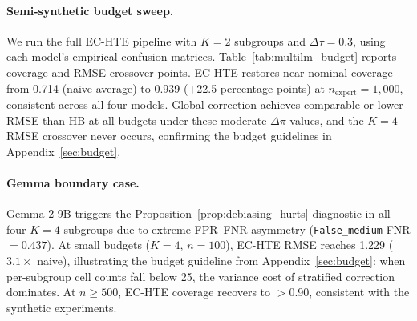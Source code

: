 \paragraph{Semi-synthetic budget sweep.}
We run the full EC-HTE pipeline with $K{=}2$ subgroups and $\Delta\tau{=}0.3$, using each model's empirical confusion matrices.
Table~\ref{tab:multilm_budget} reports coverage and RMSE crossover points.
EC-HTE restores near-nominal coverage from 0.714 (naive average) to 0.939 ($+$22.5 percentage points) at $n_{\text{expert}}{=}1{,}000$, consistent across all four models.
Global correction achieves comparable or lower RMSE than HB at all budgets under these moderate $\Delta\pi$ values, and the $K{=}4$ RMSE crossover never occurs, confirming the budget guidelines in Appendix~\ref{sec:budget}.

\begin{table}[t]
\centering
\caption{Semi-synthetic budget sweep ($K{=}2$, $\Delta\tau{=}0.3$, 50 MC runs; see Appendix~\ref{app:mcse} for MC tier justification). Coverage at selected expert budgets; RMSE crossover denotes the minimum expert budget at which HB EC-HTE achieves lower RMSE than the naive (uncorrected) estimator.}
\label{tab:multilm_budget}
\small
{}
\end{table}

\paragraph{Gemma boundary case.}
Gemma-2-9B triggers the Proposition~\ref{prop:debiasing_hurts} diagnostic in all four $K{=}4$ subgroups due to extreme FPR--FNR asymmetry (\texttt{False\_medium} FNR $= 0.437$).
At small budgets ($K{=}4$, $n{=}100$), EC-HTE RMSE reaches 1.229 ($3.1\times$ naive), illustrating the budget guideline from Appendix~\ref{sec:budget}: when per-subgroup cell counts fall below 25, the variance cost of stratified correction dominates.
At $n \geq 500$, EC-HTE coverage recovers to $>$0.90, consistent with the synthetic experiments.

